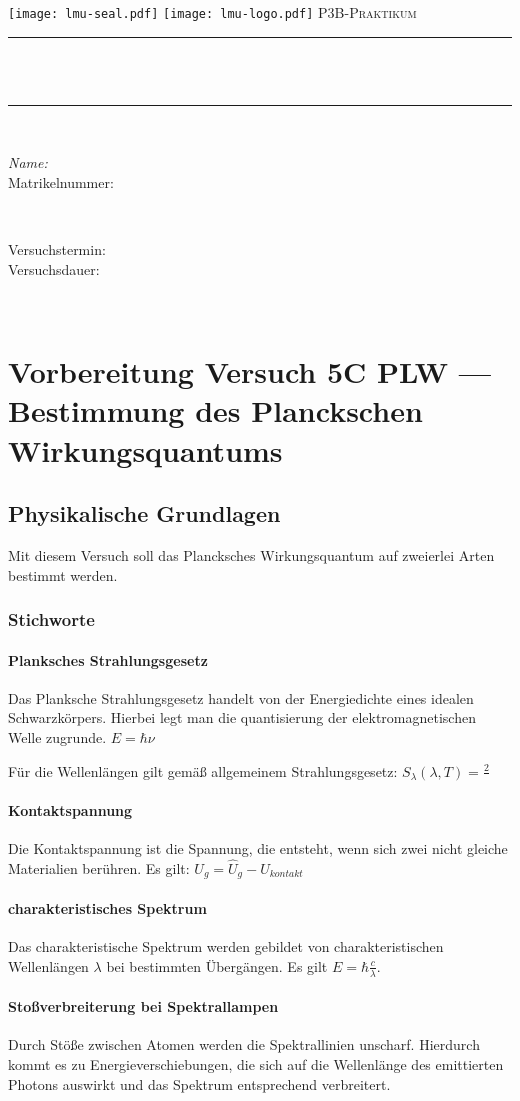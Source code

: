 \documentclass[12pt,oneside,oldfontcommands]{memoir}
\makeatletter
\def\maketitle{%
  \null
  \thispagestyle{empty}
  \begin{center}\leavevmode
       \normalfont

       
       \newpage
       \texttt{[image: lmu-seal.pdf]}
       \texttt{[image: lmu-logo.pdf]}
       \vskip 0.5cm   
       \textsc{\Large P3B-Praktikum}\\[0.5 cm]
	     {\large \@date\par}
       \vskip 1.0cm
	\rule{\linewidth}{0.2 mm} \\[0.4 cm]
	{ \huge \bfseries \@title}\\
	\rule{\linewidth}{0.2 mm} \\[1.5 cm]
	
	\begin{minipage}{0.5\textwidth}
		\begin{flushleft} \large
			\emph{Name:} \studentfullname\\
			Matrikelnummer: \matrikelnumber
			\end{flushleft}
			\end{minipage}~
			\begin{minipage}{0.4\textwidth}
			\begin{flushleft} \large
			Versuchstermin: \dateexperiment\\
			Versuchsdauer: \timeexperiment
		\end{flushleft}
	\end{minipage}\\[2 cm]
   \end{center}
   \vfill
   \null
   \cleardoublepage
  }
\makeatother
\begin{document}
\maketitle
\frontmatter
\let\cleardoublepage\clearpage
\mainmatter
\sloppy




\setcounter{tocdepth}{3}
\tableofcontents

\section{Vorbereitung Versuch 5C PLW --- Bestimmung des Planckschen Wirkungsquantums}
\subsection{Physikalische Grundlagen}
Mit diesem Versuch soll das Plancksches Wirkungsquantum auf zweierlei Arten bestimmt werden.
\subsubsection{Stichworte}
\paragraph{Planksches Strahlungsgesetz}
Das Planksche Strahlungsgesetz handelt von der Energiedichte eines idealen Schwarzkörpers. Hierbei legt man die quantisierung der elektromagnetischen Welle zugrunde. $E = \hbar \nu $

Für die Wellenlängen gilt gemäß allgemeinem Strahlungsgesetz:
$S_\lambda(\lambda,T) = \frac{2}{}$
\paragraph{Kontaktspannung}
Die Kontaktspannung ist die Spannung, die entsteht, wenn sich zwei nicht gleiche Materialien berühren. Es gilt: $U_g = \hat{U}_g - U_{kontakt}$
\paragraph{charakteristisches Spektrum}
Das charakteristische Spektrum werden gebildet von charakteristischen Wellenlängen $\lambda$ bei bestimmten Übergängen. Es gilt $E = \hbar \frac{c}{\lambda}$.
\paragraph{Stoßverbreiterung bei Spektrallampen}
Durch Stöße zwischen Atomen werden die Spektrallinien unscharf. Hierdurch kommt es zu Energieverschiebungen, die sich auf die Wellenlänge des emittierten Photons auswirkt und das Spektrum entsprechend verbreitert.
\end{document}
